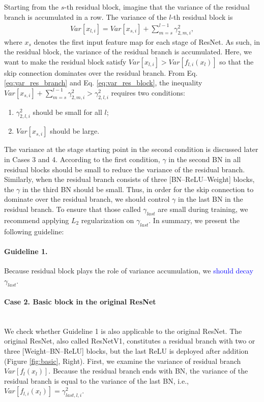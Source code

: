 \documentclass{article}
\begin{document}
Starting from the $s$-th residual block, imagine that the variance of the residual branch is accumulated in a row. The variance of the $l$-th residual block is
\begin{align}
	Var[x_{l,i}] = Var[x_{s,i}] + \sum_{m=s}^{l-1} \gamma_{2,m,i}^2, \label{eq:var_res_block}
\end{align}
where $x_s$ denotes the first input feature map for each stage of ResNet. As such, in the residual block, the variance of the residual branch is accumulated. Here, we want to make the residual block satisfy $Var[x_{l,i}] > Var[f_{l,i}(x_l)]$ so that the skip connection dominates over the residual branch. From Eq. \ref{eq:var_res_branch} and Eq. \ref{eq:var_res_block}, the inequality $Var[x_{s,i}] + \sum_{m=s}^{l-1} \gamma_{2,m,i}^2 > \gamma_{2,l,i}^2$ requires two conditions:
\begin{enumerate}
	\item $\gamma_{2,l,i}^2$ should be small for all $l$;
	\item $Var[x_{s,i}]$ should be large.
\end{enumerate}
The variance at the stage starting point in the second condition is discussed later in Cases 3 and 4. According to the first condition, $\gamma$ in the second BN in all residual blocks should be small to reduce the variance of the residual branch. Similarly, when the residual branch consists of three [BN--ReLU--Weight] blocks, the $\gamma$ in the third BN should be small. Thus, in order for the skip connection to dominate over the residual branch, we should control $\gamma$ in the last BN in the residual branch. To ensure that those called $\gamma_{last}$ are small during training, we recommend applying $L_2$ regularization on $\gamma_{last}$. In summary, we present the following guideline:
\paragraph{Guideline 1.}Because residual block plays the role of variance accumulation, we \textcolor{blue}{should decay} $\gamma_{last}$.

\paragraph{Case 2. Basic block in the original ResNet} \ \\
We check whether Guideline 1 is also applicable to the original ResNet. The original ResNet, also called ResNetV1, constitutes a residual branch with two or three [Weight--BN--ReLU] blocks, but the last ReLU is deployed after addition (Figure \ref{fig:basic}, Right). First, we examine the variance of residual branch $Var[f_l(x_l)]$. Because the residual branch ends with BN, the variance of the residual branch is equal to the variance of the last BN, i.e., $Var[f_{l,i}(x_l)] = \gamma_{last,l,i}^2$.
\end{document}
